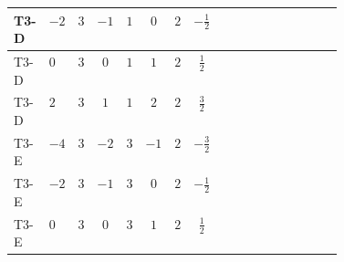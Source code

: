 \documentclass[8pt]{article}
\begin{document}
\begin{landscape}
\begin{longtable}{@{}llcccccc >{\raggedright\arraybackslash}p{0.21\linewidth} >{\raggedright\arraybackslash}p{0.21\linewidth}@{}}
\midrule
T3-D & $-2$ & $3$ & $-1$ & $1$ & $0$ & $2$ & $-\frac{1}{2}$ & \scriptsize\adjustbox{max width=\linewidth}{$\begin{gathered} 6 C_{5} Y_d Y_d^\dagger\end{gathered}$} & \scriptsize\adjustbox{max width=\linewidth}{$\begin{gathered} 6 C_{5} Y_u Y_u^\dagger\end{gathered}$} \\
\midrule
T3-D & $0$ & $3$ & $0$ & $1$ & $1$ & $2$ & $\frac{1}{2}$ & \scriptsize\adjustbox{max width=\linewidth}{$\begin{gathered} 6 C_{5} Y_d Y_d^\dagger\end{gathered}$} & \scriptsize\adjustbox{max width=\linewidth}{$\begin{gathered} 6 C_{5} Y_u Y_u^\dagger\end{gathered}$} \\
\midrule
T3-D & $2$ & $3$ & $1$ & $1$ & $2$ & $2$ & $\frac{3}{2}$ & \scriptsize\adjustbox{max width=\linewidth}{$\begin{gathered} 6 C_{5} Y_d Y_d^\dagger\end{gathered}$} & \scriptsize\adjustbox{max width=\linewidth}{$\begin{gathered} 6 C_{5} Y_u Y_u^\dagger\end{gathered}$} \\
\midrule
T3-E & $-4$ & $3$ & $-2$ & $3$ & $-1$ & $2$ & $-\frac{3}{2}$ & \scriptsize\adjustbox{max width=\linewidth}{$\begin{gathered} 6 C_{5} Y_d Y_d^\dagger\end{gathered}$} & \scriptsize\adjustbox{max width=\linewidth}{$\begin{gathered} 6 C_{5} Y_u Y_u^\dagger\end{gathered}$} \\
\midrule
T3-E & $-2$ & $3$ & $-1$ & $3$ & $0$ & $2$ & $-\frac{1}{2}$ & \scriptsize\adjustbox{max width=\linewidth}{$\begin{gathered} 6 C_{5} Y_d Y_d^\dagger\end{gathered}$} & \scriptsize\adjustbox{max width=\linewidth}{$\begin{gathered} 6 C_{5} Y_u Y_u^\dagger\end{gathered}$} \\
\midrule
T3-E & $0$ & $3$ & $0$ & $3$ & $1$ & $2$ & $\frac{1}{2}$ & \scriptsize\adjustbox{max width=\linewidth}{$\begin{gathered} 6 C_{5} Y_d Y_d^\dagger\end{gathered}$} & \scriptsize\adjustbox{max width=\linewidth}{$\begin{gathered} 6 C_{5} Y_u Y_u^\dagger\end{gathered}$} \\

\end{longtable}
\end{landscape}
\end{document}
